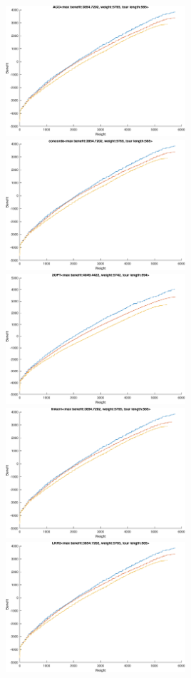 \documentclass{article}
\begin{document}
\noindent
\includegraphics[width=0.5\textwidth]{eil76figs/eil76_n75_bounded-strongly-corr_01.ttp.aco.txt.atsf.eps}
\includegraphics[width=0.5\textwidth]{eil76figs/eil76_n75_bounded-strongly-corr_01.ttp.con.txt.atsf.eps}
\includegraphics[width=0.5\textwidth]{eil76figs/eil76_n75_bounded-strongly-corr_01.ttp.inv.txt.atsf.eps}
\includegraphics[width=0.5\textwidth]{eil76figs/eil76_n75_bounded-strongly-corr_01.ttp.lkh.txt.atsf.eps}
\includegraphics[width=0.5\textwidth]{eil76figs/eil76_n75_bounded-strongly-corr_01.ttp.lkh2.txt.atsf.eps}
\end{document}
